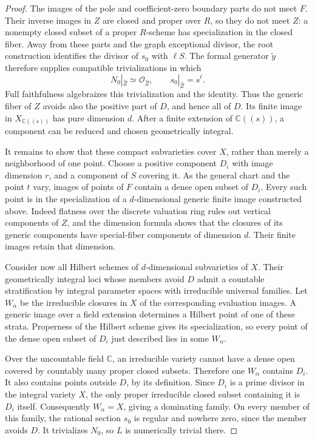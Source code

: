 \documentclass[11pt,letterpaper]{article}
\newcommand{\C}{\mathbb{C}}
\newcommand{\OO}{\mathcal{O}}
\theoremstyle{definition}
\theoremstyle{remark}
\begin{document}
\begin{proof}
The images of the pole and coefficient-zero boundary
parts do not meet $F$.  Their inverse images in $Z$ are
closed and proper over $R$, so they do not meet $Z$:
a nonempty closed subset of a proper $R$-scheme has
specialization in the closed fiber.  Away from these parts
and the graph exceptional divisor, the root construction
identifies the divisor of $s_0$ with $\ell S$.
The formal generator $\widetilde y$ therefore supplies
compatible trivializations in which
\[
 N_0|_{\widehat Z}\simeq\OO_{\widehat Z},
 \qquad s_0|_{\widehat Z}=s^\ell.
\]
Full faithfulness algebraizes this trivialization and the
identity.  Thus the generic fiber of $Z$ avoids also the
positive part of $D$, and hence all of $D$.
Its finite image in $X_{\C((s))}$ has pure dimension $d$.
After a finite extension of $\C((s))$, a component can be
reduced and chosen geometrically integral.

It remains to show that these compact subvarieties cover
$X$, rather than merely a neighborhood of one point.
Choose a positive component $D_i$ with image dimension
$r$, and a component of $S$ covering it.  As the general
chart and the point $t$ vary, images of points of $F$
contain a dense open subset of $D_i$.
Every such point is in the specialization of a
$d$-dimensional generic finite image constructed above.
Indeed flatness over the discrete valuation ring rules
out vertical components of $Z$, and the dimension
formula shows that the closures of its generic
components have special-fiber components of dimension
$d$.  Their finite images retain that dimension.

Consider now all Hilbert schemes of $d$-dimensional
subvarieties of $X$.  Their geometrically integral loci
whose members avoid $D$ admit a countable stratification
by integral parameter spaces with irreducible universal
families.  Let $W_\alpha$ be the irreducible closures in
$X$ of the corresponding evaluation images.  A generic
image over a field extension determines a Hilbert point
of one of these strata.  Properness of the Hilbert scheme
gives its specialization, so every point of the dense
open subset of $D_i$ just described lies in some
$W_\alpha$.

Over the uncountable field $\C$, an irreducible variety
cannot have a dense open covered by countably many proper
closed subsets.  Therefore one $W_\alpha$ contains
$D_i$.  It also contains points outside $D$, by its
definition.  Since $D_i$ is a prime divisor in the
integral variety $X$, the only proper irreducible closed
subset containing it is $D_i$ itself.  Consequently
$W_\alpha=X$, giving a dominating family.
On every member of this family, the rational section
$s_0$ is regular and nowhere zero, since the member
avoids $D$.  It trivializes $N_0$, so $L$ is numerically
trivial there.
\end{proof}
\end{document}
